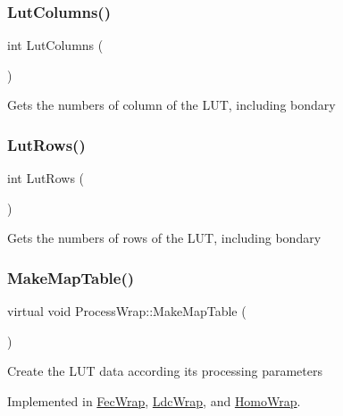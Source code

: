 \subsubsection{\texorpdfstring{Lut\+Columns()}{LutColumns()}}
{\footnotesize\ttfamily int Lut\+Columns (\begin{DoxyParamCaption}{ }\end{DoxyParamCaption})\hspace{0.3cm}{\ttfamily [inline]}}

Gets the numbers of column of the L\+UT, including bondary \mbox{\label{class_process_wrap_a805d35317ea071adec5d6a4497608e43}} 
\subsubsection{\texorpdfstring{Lut\+Rows()}{LutRows()}}
{\footnotesize\ttfamily int Lut\+Rows (\begin{DoxyParamCaption}{ }\end{DoxyParamCaption})\hspace{0.3cm}{\ttfamily [inline]}}

Gets the numbers of rows of the L\+UT, including bondary \mbox{\label{class_process_wrap_a22910a91f52147b8631b7e880509996e}} 
\subsubsection{\texorpdfstring{Make\+Map\+Table()}{MakeMapTable()}}
{\footnotesize\ttfamily virtual void Process\+Wrap\+::\+Make\+Map\+Table (\begin{DoxyParamCaption}{ }\end{DoxyParamCaption})\hspace{0.3cm}{\ttfamily [pure virtual]}}

Create the L\+UT data according its processing parameters 

Implemented in \mbox{\hyperlink{class_fec_wrap_ac1c213fd03716ce0bb6430e2d2bf7962}{Fec\+Wrap}}, \mbox{\hyperlink{class_ldc_wrap_a0c6a77b5857bf0bc57c935b8612df9ad}{Ldc\+Wrap}}, and \mbox{\hyperlink{class_homo_wrap_a04c5506434d9afe322bfd6c08c51868f}{Homo\+Wrap}}.

